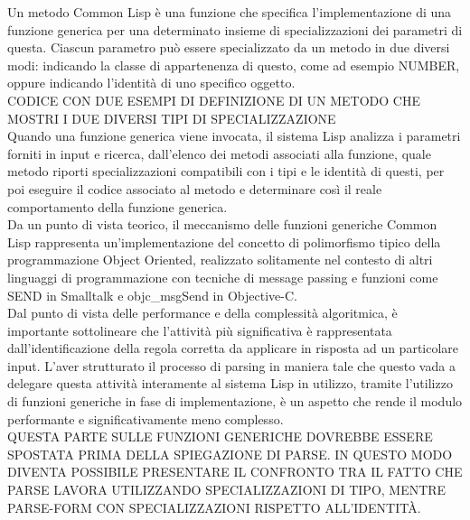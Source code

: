 Un metodo Common Lisp è una funzione che specifica l’implementazione di una
funzione generica per una determinato insieme di specializzazioni dei
parametri di questa. Ciascun parametro può essere specializzato da un metodo
in due diversi modi: indicando la classe di appartenenza di questo, come ad
esempio NUMBER, oppure indicando l’identità di uno specifico oggetto.\\

CODICE CON DUE ESEMPI DI DEFINIZIONE DI UN METODO CHE MOSTRI I DUE DIVERSI
TIPI DI SPECIALIZZAZIONE\\

Quando una funzione generica viene invocata, il sistema Lisp analizza i
parametri forniti in input e ricerca, dall’elenco dei metodi associati alla
funzione, quale metodo riporti specializzazioni compatibili con i tipi e le
identità di questi, per poi eseguire il codice associato al metodo e
determinare così il reale comportamento della funzione generica.\\

Da un punto di vista teorico, il meccanismo delle funzioni generiche Common
Lisp rappresenta un’implementazione del concetto di polimorfismo tipico della
programmazione Object Oriented, realizzato solitamente nel contesto di altri
linguaggi di programmazione con tecniche di message passing e funzioni come
SEND in Smalltalk e objc\_msgSend in Objective-C.\\

Dal punto di vista delle performance e della complessità algoritmica, è
importante sottolineare che l’attività più significativa è rappresentata
dall’identificazione della regola corretta da applicare in risposta ad un
particolare input. L’aver strutturato il processo di parsing in maniera tale
che questo vada a delegare questa attività interamente al sistema Lisp in
utilizzo, tramite l’utilizzo di funzioni generiche in fase di implementazione,
è un aspetto che rende il modulo performante e significativamente meno
complesso.\\

QUESTA PARTE SULLE FUNZIONI GENERICHE DOVREBBE ESSERE SPOSTATA PRIMA DELLA
SPIEGAZIONE DI PARSE. IN QUESTO MODO DIVENTA POSSIBILE PRESENTARE IL CONFRONTO
TRA IL FATTO CHE PARSE LAVORA UTILIZZANDO SPECIALIZZAZIONI DI TIPO, MENTRE
PARSE-FORM CON SPECIALIZZAZIONI RISPETTO ALL’IDENTITÀ.\\

